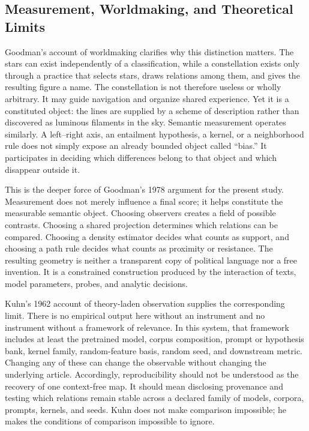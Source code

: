 \subsection{Measurement, Worldmaking, and Theoretical Limits}

Goodman's account of worldmaking clarifies why this distinction matters. The stars can exist independently of a classification, while a constellation exists only through a practice that selects stars, draws relations among them, and gives the resulting figure a name. The constellation is not therefore useless or wholly arbitrary. It may guide navigation and organize shared experience. Yet it is a constituted object: the lines are supplied by a scheme of description rather than discovered as luminous filaments in the sky. Semantic measurement operates similarly. A left--right axis, an entailment hypothesis, a kernel, or a neighborhood rule does not simply expose an already bounded object called ``bias.'' It participates in deciding which differences belong to that object and which disappear outside it.

This is the deeper force of Goodman's 1978 argument for the present study. Measurement does not merely influence a final score; it helps constitute the measurable semantic object. Choosing observers creates a field of possible contrasts. Choosing a shared projection determines which relations can be compared. Choosing a density estimator decides what counts as support, and choosing a path rule decides what counts as proximity or resistance. The resulting geometry is neither a transparent copy of political language nor a free invention. It is a constrained construction produced by the interaction of texts, model parameters, probes, and analytic decisions.

Kuhn's 1962 account of theory-laden observation supplies the corresponding limit. There is no empirical output here without an instrument and no instrument without a framework of relevance. In this system, that framework includes at least the pretrained model, corpus composition, prompt or hypothesis bank, kernel family, random-feature basis, random seed, and downstream metric. Changing any of these can change the observable without changing the underlying article. Accordingly, reproducibility should not be understood as the recovery of one context-free map. It should mean disclosing provenance and testing which relations remain stable across a declared family of models, corpora, prompts, kernels, and seeds. Kuhn does not make comparison impossible; he makes the conditions of comparison impossible to ignore.

